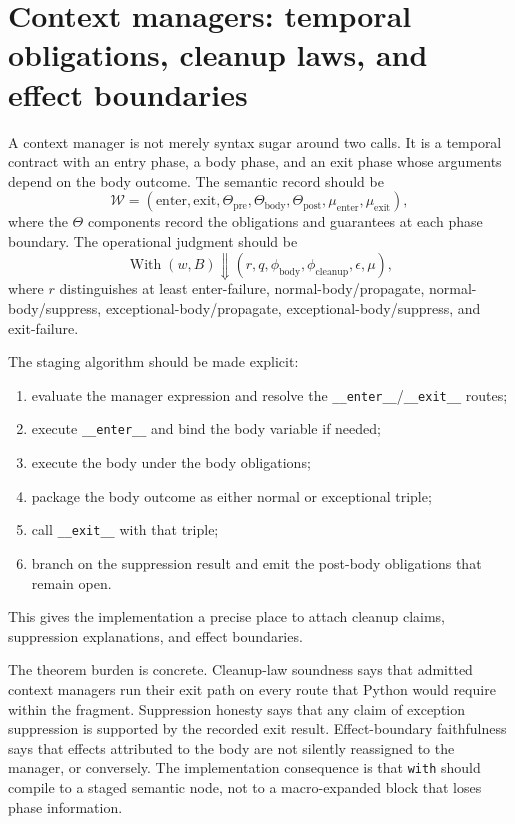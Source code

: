 \documentclass[11pt]{report}
\begin{document}
\section{Context managers: temporal obligations, cleanup laws, and effect boundaries}
A context manager is not merely syntax sugar around two calls. It is a temporal contract with an entry phase, a body phase, and an exit phase whose arguments depend on the body outcome. The semantic record should be
\[
\mathcal{W} = (\mathrm{enter},\mathrm{exit},\Theta_{\mathrm{pre}},\Theta_{\mathrm{body}},\Theta_{\mathrm{post}},\mu_{\mathrm{enter}},\mu_{\mathrm{exit}}),
\]
where the $\Theta$ components record the obligations and guarantees at each phase boundary. The operational judgment should be
\[
\operatorname{With}(w,B) \Downarrow (r,q,\phi_{\mathrm{body}},\phi_{\mathrm{cleanup}},\epsilon,\mu),
\]
where $r$ distinguishes at least enter-failure, normal-body/propagate, normal-body/suppress, exceptional-body/propagate, exceptional-body/suppress, and exit-failure.

The staging algorithm should be made explicit:
\begin{enumerate}
\item evaluate the manager expression and resolve the \texttt{\_\_enter\_\_}/\texttt{\_\_exit\_\_} routes;
\item execute \texttt{\_\_enter\_\_} and bind the body variable if needed;
\item execute the body under the body obligations;
\item package the body outcome as either normal or exceptional triple;
\item call \texttt{\_\_exit\_\_} with that triple;
\item branch on the suppression result and emit the post-body obligations that remain open.
\end{enumerate}
This gives the implementation a precise place to attach cleanup claims, suppression explanations, and effect boundaries.

The theorem burden is concrete. Cleanup-law soundness says that admitted context managers run their exit path on every route that Python would require within the fragment. Suppression honesty says that any claim of exception suppression is supported by the recorded exit result. Effect-boundary faithfulness says that effects attributed to the body are not silently reassigned to the manager, or conversely. The implementation consequence is that \texttt{with} should compile to a staged semantic node, not to a macro-expanded block that loses phase information.
\end{document}
